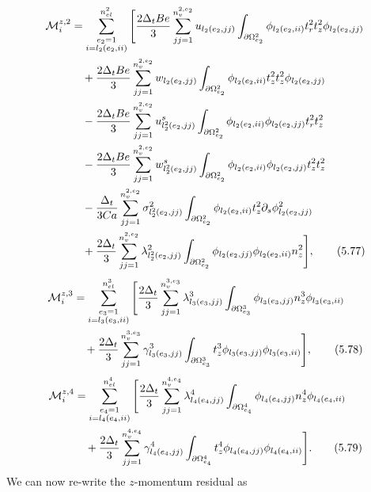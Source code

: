 \documentclass{article}
\begin{document}
\begin{align}
\mathcal{M}_i^{z,2} &= \sum_{\substack{e_2=1\\ i=l_2(e_2,ii)}}^{n_{el}^2} \Bigg[ \frac{2\Delta_t Be}{3} \sum_{jj=1}^{n_v^{2,e_2}} u_{l_2(e_2,jj)} \int_{\partial \Omega_{e_2}^2} \phi_{l_2(e_2,ii)} t_r^2 t_z^2 \phi_{l_2(e_2,jj)} \nonumber\\
&\quad + \frac{2\Delta_t Be}{3} \sum_{jj=1}^{n_v^{2,e_2}} w_{l_2(e_2,jj)} \int_{\partial \Omega_{e_2}^2} \phi_{l_2(e_2,ii)} t_z^2 t_z^2 \phi_{l_2(e_2,jj)} \nonumber\\
&\quad - \frac{2\Delta_t Be}{3} \sum_{jj=1}^{n_v^{2,e_2}} u_{l_2^2(e_2,jj)}^s \int_{\partial \Omega_{e_2}^2} \phi_{l_2(e_2,ii)} \phi_{l_2(e_2,jj)} t_r^2 t_z^2 \nonumber\\
&\quad - \frac{2\Delta_t Be}{3} \sum_{jj=1}^{n_v^{2,e_2}} w_{l_2^2(e_2,jj)}^s \int_{\partial \Omega_{e_2}^2} \phi_{l_2(e_2,ii)} \phi_{l_2(e_2,jj)} t_z^2 t_z^2 \nonumber\\
&\quad - \frac{\Delta_t}{3Ca} \sum_{jj=1}^{n_v^{2,e_2}} \sigma_{l_2^2(e_2,jj)}^2 \int_{\partial \Omega_{e_2}^2} \phi_{l_2(e_2,ii)} t_z^2 \partial_s \phi_{l_2(e_2,jj)}^2 \nonumber\\
&\quad + \frac{2\Delta_t}{3} \sum_{jj=1}^{n_v^{2,e_2}} \lambda_{l_2^2(e_2,jj)}^2 \int_{\partial \Omega_{e_2}^2} \phi_{l_2(e_2,jj)} \phi_{l_2(e_2,ii)} n_z^2 \Bigg], \tag{5.77}
\end{align}
\begin{align}
\mathcal{M}_i^{z,3} &= \sum_{\substack{e_3=1\\ i=l_3(e_3,ii)}}^{n_{el}^3} \Bigg[ \frac{2\Delta_t}{3} \sum_{jj=1}^{n_v^{3,e_3}} \lambda_{l_3(e_3,jj)}^3 \int_{\partial \Omega_{e_3}^3} \phi_{l_3(e_3,jj)} n_z^3 \phi_{l_3(e_3,ii)} \nonumber\\
&\quad + \frac{2\Delta_t}{3} \sum_{jj=1}^{n_v^{3,e_3}} \gamma_{l_3(e_3,jj)}^3 \int_{\partial \Omega_{e_3}^3} t_z^3 \phi_{l_3(e_3,jj)} \phi_{l_3(e_3,ii)} \Bigg], \tag{5.78}
\end{align}
\begin{align}
\mathcal{M}_i^{z,4} &= \sum_{\substack{e_4=1\\ i=l_4(e_4,ii)}}^{n_{el}^4} \Bigg[ \frac{2\Delta_t}{3} \sum_{jj=1}^{n_v^{4,e_4}} \lambda_{l_4(e_4,jj)}^4 \int_{\partial \Omega_{e_4}^4} \phi_{l_4(e_4,jj)} n_z^4 \phi_{l_4(e_4,ii)} \nonumber\\
&\quad + \frac{2\Delta_t}{3} \sum_{jj=1}^{n_v^{4,e_4}} \gamma_{l_4(e_4,jj)}^4 \int_{\partial \Omega_{e_4}^4} t_z^4 \phi_{l_4(e_4,jj)} \phi_{l_4(e_4,ii)} \Bigg]. \tag{5.79}
\end{align}
We can now re-write the $z$-momentum residual as
\end{document}
